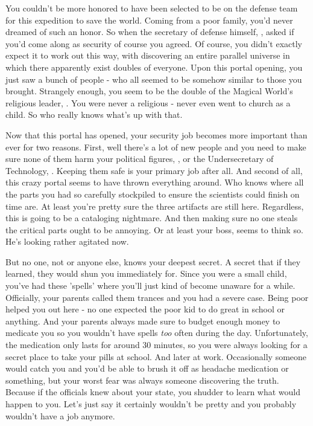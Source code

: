 \documentclass[char]{guildcamp3}
\begin{document}
\name{\cSpecOpTwo{}}





You couldn't be more honored to have been selected to be on the defense team for this expedition to save the world. Coming from a poor family, you'd never dreamed of such an honor. So when the secretary of defense himself, \cPoliOne{\intro}, asked if you'd come along as security of course you agreed. Of course, you didn't exactly expect it to work out this way, with discovering an entire parallel universe in which there apparently exist doubles of everyone. Upon this portal opening, you just saw a bunch of people - who all seemed to be somehow similar to those you brought. Strangely enough, you seem to be the double of the Magical World's religious leader, \cPaladin{\intro}. You were never a religious \pronoun{\human} - never even went to church as a child. So who really knows what's up with that.

Now that this portal has opened, your security job becomes more important than ever for two reasons. First, well there's a lot of new people and you need to make sure none of them harm your political figures, \cPoliOne{}, or the Undersecretary of Technology, \cPoliTwo{}. Keeping them safe is your primary job after all. And second of all, this crazy portal seems to have thrown everything around. Who knows where all the parts you had so carefully stockpiled to ensure the scientists could finish on time are. At least you're pretty sure the three artifacts are still here. Regardless, this is going to be a cataloging nightmare. And then making sure no one steals the critical parts ought to be annoying. Or at least your boss, \cSpecOpOne{\intro} seems to think so. He's looking rather agitated now. 

But no one, not \cPoliOne{} or anyone else, knows your deepest secret. A secret that if they learned, they would shun you immediately for. Since you were a small child, you've had these 'spells' where you'll just kind of become unaware for a while. Officially, your parents called them trances and you had a severe case. Being poor helped you out here - no one expected the poor kid to do great in school or anything. And your parents always made sure to budget enough money to medicate you so you wouldn't have spells \emph{too} often during the day. Unfortunately, the medication only lasts for around 30 minutes, so you were always looking for a secret place to take your pills at school. And later at work. Occasionally someone would catch you and you'd be able to brush it off as headache medication or something, but your worst fear was always someone discovering the truth. Because if the officials knew about your state, you shudder to learn what would happen to you. Let's just say it certainly wouldn't be pretty and you probably wouldn't have a job anymore.
\end{document}
